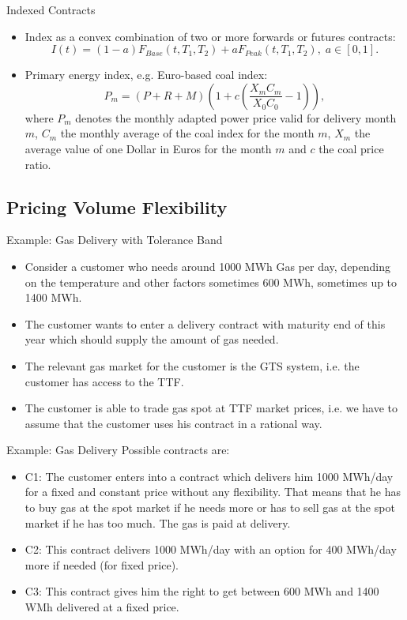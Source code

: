 {Indexed Contracts}
\begin{itemize}
  \item<1-> Index as a convex combination of two or more forwards or futures contracts:
  $$I(t)=(1-a)F_{Base}(t,T_1,T_2)+aF_{Peak}(t,T_1,T_2),\;a\in[0,1].$$
  \item<2-> Primary energy index, e.g. Euro-based coal index:
  $$P_m=(P+R+M)\left(1+c\left(\frac{X_mC_m}{X_0C_0}-1\right)\right),$$
  where $P_m$ denotes the monthly adapted power price valid for delivery month $m$, $C_m$ the monthly average of the coal index for the month $m$, $X_m$ the average value of one Dollar in Euros for the month $m$ and $c$ the coal price ratio.
\end{itemize}

\subsection{Pricing Volume Flexibility}



{Example: Gas Delivery with Tolerance Band}
\begin{itemize}
\item<1-> Consider a customer who needs around 1000 MWh Gas per day, depending on the temperature and other factors sometimes 600 MWh, sometimes up to 1400 MWh.
\item<2-> The customer wants to enter a delivery contract with maturity end of this year which should supply the amount of gas needed.
\item<3-> The relevant gas market for the customer is the GTS system, i.e. the customer has access to the TTF.
\item<3-> The customer is able to trade gas spot at TTF market prices, i.e. we have to assume that the customer uses his contract in a rational way.
\end{itemize}



{Example: Gas Delivery}
Possible contracts are:
\begin{itemize}
\item<1->  C1: The customer enters into a contract which delivers him 1000 MWh/day for a fixed and constant price without any flexibility. That means that he has to buy gas at the spot market if he needs more or has to sell gas at the spot market if he has too much. The gas is paid at delivery.
\item<2-> C2: This contract delivers 1000 MWh/day with an option for 400 MWh/day more if needed (for fixed price).
\item<3-> C3: This contract gives him the right to get between 600 MWh and 1400 WMh delivered at a fixed price.
\end{itemize}





